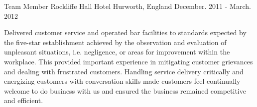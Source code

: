 \begin{cventries}
  \cventry
    {Team Member} %
    {Rockliffe Hall Hotel} %
    {Hurworth, England} %
    {December. 2011 - March. 2012} %
    {
      \begin{cvitems} %
        \item {Delivered customer service and operated bar facilities to standards expected by the five-star establishment achieved by the observation and evaluation of unpleasant situations, i.e. negligence, or areas for improvement within the workplace. This provided important experience in mitigating customer grievances and dealing with frustrated customers. Handling service delivery critically and energizing customers with conversation skills made customers feel continually welcome to do business with us and ensured the business remained competitive and efficient.}
      \end{cvitems}
    }

\end{cventries}

